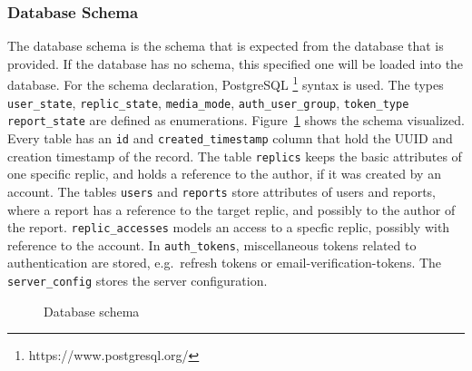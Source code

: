 \subsubsection{Database Schema}
The database schema is the schema that is expected from the database that is provided.
If the database has no schema, this specified one will be loaded into the database. \newline
For the schema declaration, PostgreSQL \footnote{https://www.postgresql.org/} syntax is used.
The types \texttt{user\_state}, \texttt{replic\_state}, \texttt{media\_mode}, \texttt{auth\_user\_group}, \texttt{token\_type} \texttt{report\_state} are defined as enumerations. \newline
Figure~\ref{fig:database-schema} shows the schema visualized.
Every table has an \texttt{id} and \texttt{created\_timestamp} column that hold the UUID and creation timestamp of the record. \newline
The table \texttt{replics} keeps the basic attributes of one specific replic, and holds a reference to the author, if it was created by an account.
The tables \texttt{users} and \texttt{reports} store attributes of users and reports, where a report has a reference to the target replic, and possibly to the author of the report.
\texttt{replic\_accesses} models an access to a specfic replic, possibly with reference to the account.
In \texttt{auth\_tokens}, miscellaneous tokens related to authentication are stored, e.g.\ refresh tokens or email-verification-tokens.
The \texttt{server\_config} stores the server configuration.

\begin{figure}
    \centering
    \caption{Database schema}
    \label{fig:database-schema}
\end{figure}

